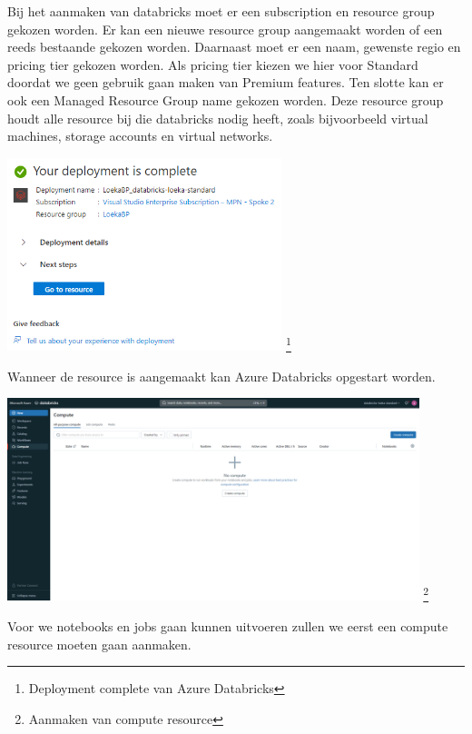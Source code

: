 Bij het aanmaken van databricks moet er een subscription en resource group gekozen worden. Er kan een nieuwe resource group aangemaakt worden of een reeds bestaande gekozen worden. Daarnaast moet er een naam, gewenste regio en pricing tier gekozen worden. Als pricing tier kiezen we hier voor Standard doordat we geen gebruik gaan maken van Premium features. Ten slotte kan er ook een Managed Resource Group name gekozen worden. Deze resource group houdt alle resource bij die databricks nodig heeft, zoals bijvoorbeeld virtual machines, storage accounts en virtual networks.

\begin{center}
    \includegraphics[width=0.6\textwidth]{./graphics/databricks/initial_3.png}
    \footnote{Deployment complete van Azure Databricks}
\end{center}

Wanneer de resource is aangemaakt kan Azure Databricks opgestart worden.

\begin{center}
    \includegraphics[width=0.9\textwidth]{./graphics/databricks/initial_4.png}
    \footnote{Aanmaken van compute resource}
\end{center}

Voor we notebooks en jobs gaan kunnen uitvoeren zullen we eerst een compute resource moeten gaan aanmaken.

